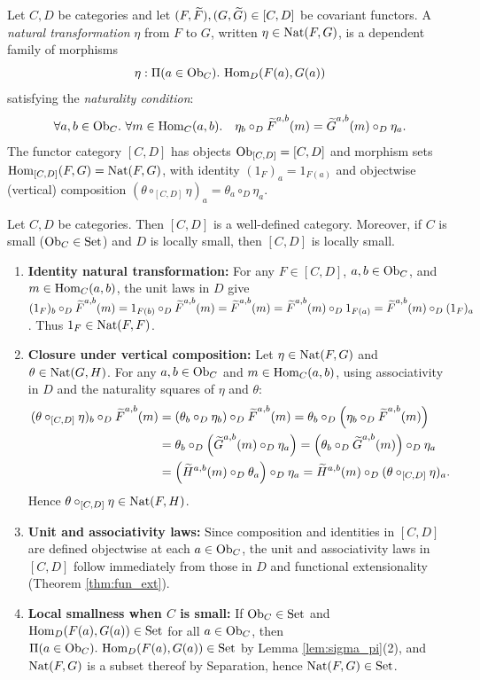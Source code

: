 \documentclass[10pt,a4paper]{article}
\begin{document}
\myqed
\begin{definition}\label{def:nat}
Let $C, D$ be categories and let $(F, {\widetilde{F}\textrm{}}), (G, {\widetilde{G}\textrm{}}) \in [C, D]$ be covariant functors. A \emph{natural transformation} $\eta$ from $F$ to $G$, written $\eta \in {\textrm{Nat}}(F, G)$, is a dependent family of morphisms
$$\eta : \Pi(a \in {\textrm{Ob}}_C).\ {\textrm{Hom}}_D(F(a), G(a))$$
satisfying the \emph{naturality condition}:
$$\forall a, b \in \Ob_C.\ \forall m \in \Hom_C(a,b).\quad \eta_b \circ_D \FMor^{a,b}(m) = \GMor^{a,b}(m) \circ_D \eta_a.$$
The functor category $[C, D]$ has objects ${\textrm{Ob}}_{[C,D]} = [C,D]$ and morphism sets ${\textrm{Hom}}_{[C,D]}(F,G) = {\textrm{Nat}}(F,G)$, with identity $\left(1_F\right)_a = 1_{F(a)}$ and objectwise (vertical) composition $(\theta \circ_{[C,D]} \eta)_a = \theta_a \circ_D \eta_a$.
\end{definition}

\begin{lemma}\label{lem:fun_cat}
Let $C, D$ be categories. Then $[C, D]$ is a well-defined category. Moreover, if $C$ is small (${\textrm{Ob}}_C \in {\textrm{Set}}$) and $D$ is locally small, then $[C, D]$ is locally small.
\end{lemma}
\myprf
\begin{enumerate}
\item \textbf{Identity natural transformation:} For any $F \in [C, D]$, $a, b \in {\textrm{Ob}}_C$, and $m \in {\textrm{Hom}}_C(a,b)$, the unit laws in $D$ give $(1_F)_b \circ_D {\widetilde{F}\textrm{}}^{a,b}(m) = 1_{F(b)} \circ_D {\widetilde{F}\textrm{}}^{a,b}(m) = {\widetilde{F}\textrm{}}^{a,b}(m) = {\widetilde{F}\textrm{}}^{a,b}(m) \circ_D 1_{F(a)} = {\widetilde{F}\textrm{}}^{a,b}(m) \circ_D (1_F)_a$. Thus $1_F \in {\textrm{Nat}}(F, F)$.
\item \textbf{Closure under vertical composition:} Let $\eta \in {\textrm{Nat}}(F, G)$ and $\theta \in {\textrm{Nat}}(G, H)$. For any $a, b \in {\textrm{Ob}}_C$ and $m \in {\textrm{Hom}}_C(a,b)$, using associativity in $D$ and the naturality squares of $\eta$ and $\theta$:
\begin{align*}
(\theta \circ_{[C,D]} \eta)_b \circ_D {\widetilde{F}\textrm{}}^{a,b}(m) &= (\theta_b \circ_D \eta_b) \circ_D {\widetilde{F}\textrm{}}^{a,b}(m) = \theta_b \circ_D \left(\eta_b \circ_D {\widetilde{F}\textrm{}}^{a,b}(m)\right) \\
&= \theta_b \circ_D \left({\widetilde{G}\textrm{}}^{a,b}(m) \circ_D \eta_a\right) = \left(\theta_b \circ_D {\widetilde{G}\textrm{}}^{a,b}(m)\right) \circ_D \eta_a \\
&= \left(\widetilde{H}^{a,b}(m) \circ_D \theta_a\right) \circ_D \eta_a = \widetilde{H}^{a,b}(m) \circ_D (\theta \circ_{[C,D]} \eta)_a.
\end{align*}
Hence $\theta \circ_{[C,D]} \eta \in {\textrm{Nat}}(F, H)$.
\item \textbf{Unit and associativity laws:} Since composition and identities in $[C, D]$ are defined objectwise at each $a \in {\textrm{Ob}}_C$, the unit and associativity laws in $[C, D]$ follow immediately from those in $D$ and functional extensionality (Theorem \ref{thm:fun_ext}).
\item \textbf{Local smallness when $C$ is small:} If ${\textrm{Ob}}_C \in {\textrm{Set}}$ and ${\textrm{Hom}}_D(F(a), G(a)) \in {\textrm{Set}}$ for all $a \in {\textrm{Ob}}_C$, then $\Pi(a \in {\textrm{Ob}}_C).\ {\textrm{Hom}}_D(F(a), G(a)) \in {\textrm{Set}}$ by Lemma \ref{lem:sigma_pi}(2), and ${\textrm{Nat}}(F, G)$ is a subset thereof by Separation, hence ${\textrm{Nat}}(F, G) \in {\textrm{Set}}$.
\end{enumerate}
\myqed
\end{document}
